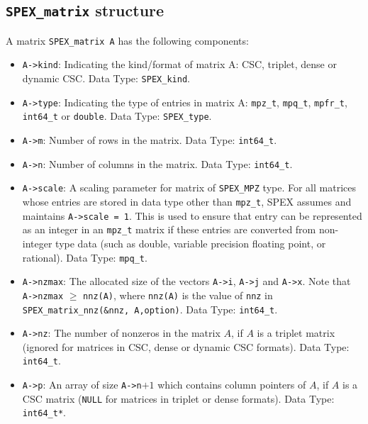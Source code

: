 \documentclass[12pt,oneside]{book}
\theoremstyle{definition}
\begin{document}
\subsection{\texttt{SPEX\_matrix} structure}
A matrix \verb|SPEX_matrix A| has the following components:

\begin{itemize}
    \item \verb|A->kind|: Indicating the kind/format of matrix A: CSC, triplet, dense or dynamic CSC. Data Type: \verb|SPEX_kind|.

    \item \verb|A->type|: Indicating the type of entries in matrix A: \verb|mpz_t|, \verb|mpq_t|, \verb|mpfr_t|, \verb|int64_t| or \verb|double|. Data Type: \verb|SPEX_type|.

    \item \verb|A->m|: Number of rows in the matrix. Data Type: \verb|int64_t|.

    \item \verb|A->n|: Number of columns in the matrix. Data Type: \verb|int64_t|.

    \item \verb|A->scale|: A scaling parameter for matrix of \verb|SPEX_MPZ| type. For all matrices whose entries are stored in data type other than \verb|mpz_t|, SPEX assumes and maintains \verb|A->scale = 1|. This is used to ensure that entry can be represented as an integer in an \verb|mpz_t| matrix if these entries are converted from non-integer type data (such as double, variable precision floating point, or rational). Data Type: \verb|mpq_t|.

    \item \verb|A->nzmax|: The allocated size of the vectors \verb|A->i|, \verb|A->j| and \verb|A->x|. Note that \verb|A->nzmax| $\geq$ \verb|nnz(A)|, where \verb|nnz(A)| is the value of \verb|nnz| in \verb|SPEX_matrix_nnz(&nnz, A,option)|. Data Type: \verb|int64_t|.

    \item \verb|A->nz|: The number of nonzeros in the matrix $A$, if $A$ is a triplet matrix (ignored for matrices in CSC, dense or dynamic CSC formats). Data Type: \verb|int64_t|.

    \item \verb|A->p|: An array of size \verb|A->n|$+1$ which contains column pointers of $A$, if $A$ is a CSC matrix (\verb|NULL| for matrices in triplet or dense formats). Data Type: \verb|int64_t*|.


\end{itemize}
\end{document}
